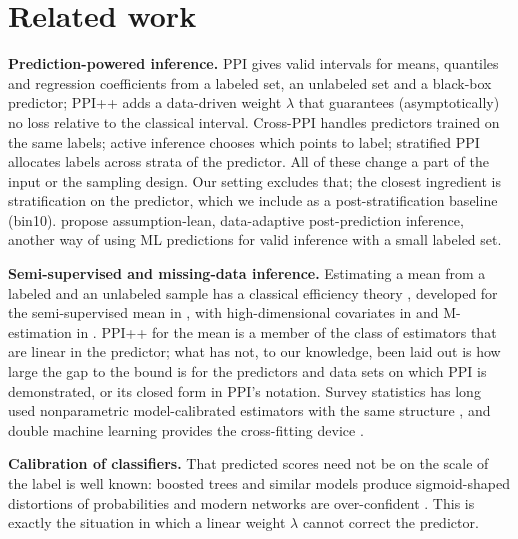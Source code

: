 \documentclass{article}
\theoremstyle{remark}\newtheorem{remark}{Remark}
\begin{document}
\section{Related work}
\textbf{Prediction-powered inference.} PPI \citep{angelopoulos2023ppi} gives valid intervals for means, quantiles and regression coefficients from a labeled set, an unlabeled set and a black-box predictor; PPI++ \citep{angelopoulos2023ppipp} adds a data-driven weight $\lambda$ that guarantees (asymptotically) no loss relative to the classical interval. Cross-PPI \citep{zrnic2023cross} handles predictors trained on the same labels; active inference \citep{zrnic2024active} chooses which points to label; stratified PPI \citep{fisch2024stratified} allocates labels across strata of the predictor. All of these change a part of the input or the sampling design. Our setting excludes that; the closest ingredient is stratification on the predictor, which we include as a post-stratification baseline (bin10). \citet{miao2023popinf} propose assumption-lean, data-adaptive post-prediction inference, another way of using ML predictions for valid inference with a small labeled set.

\textbf{Semi-supervised and missing-data inference.} Estimating a mean from a labeled and an unlabeled sample has a classical efficiency theory \citep{robins1994estimation,bickel1993efficient,tsiatis2006semiparametric}, developed for the semi-supervised mean in \citet{zhang2019semi}, with high-dimensional covariates in \citet{zhang2022high} and M-estimation in \citet{song2024general}. PPI++ for the mean is a member of the class of estimators that are linear in the predictor; what has not, to our knowledge, been laid out is how large the gap to the bound is for the predictors and data sets on which PPI is demonstrated, or its closed form in PPI's notation. Survey statistics has long used nonparametric model-calibrated estimators with the same structure \citep{sarndal1992model,montanari2005nonparametric}, and double machine learning provides the cross-fitting device \citep{chernozhukov2018dml}.

\textbf{Calibration of classifiers.} That predicted scores need not be on the scale of the label is well known: boosted trees and similar models produce sigmoid-shaped distortions of probabilities \citep{niculescu2005predicting} and modern networks are over-confident \citep{guo2017calibration}. This is exactly the situation in which a linear weight $\lambda$ cannot correct the predictor.









\appendix


\newpage

\end{document}
